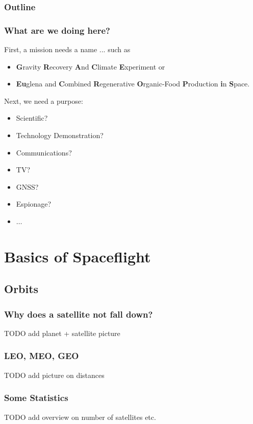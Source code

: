 \documentclass[12pt,utf8,notheorems,compress]{beamer}
\begin{document}
\begin{frame}
  \frametitle{Outline}
  \tableofcontents
\end{frame}

\begin{frame}
  \frametitle{What are we doing here?}
  \pause
  First, a mission needs a name ... such as
  \pause
  \begin{itemize}
    \item \textbf{G}ravity \textbf{R}ecovery \textbf{A}nd \textbf{C}limate \textbf{E}xperiment \pause or
    \item \textbf{Eu}glena and \textbf{C}ombined \textbf{R}egenerative \textbf{O}rganic-Food \textbf{P}roduction \textbf{i}n \textbf{S}pace.
  \end{itemize}
  \pause
  Next, we need a purpose:
  \pause
  \begin{itemize}
    \item Scientific? \pause
    \item Technology Demonstration? \pause
    \item Communications? \pause
    \item TV? \pause
    \item GNSS? \pause
    \item Espionage? \pause
    \item $\ldots$
  \end{itemize}
\end{frame}

\section{Basics of Spaceflight}

\subsection{Orbits}

\begin{frame}
  \frametitle{Why does a satellite not fall down?}
  \pause
  TODO add planet + satellite picture
\end{frame}

\begin{frame}
  \frametitle{LEO, MEO, GEO}
  \pause
  TODO add picture on distances
\end{frame}

\begin{frame}
  \frametitle{Some Statistics}
  \pause
  TODO add overview on number of satellites etc.
\end{frame}
\end{document}
